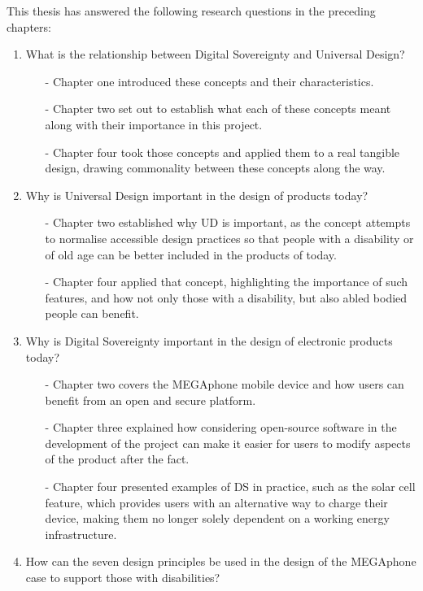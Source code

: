 This thesis has answered the following research questions in the preceding chapters:
\begin{enumerate}
    \item What is the relationship between Digital Sovereignty and Universal Design?
        \begin{enumerate}
        \item[-] Chapter one introduced these concepts and their characteristics.
        \item[-] Chapter two set out to establish what each of these concepts meant along with their importance in this project.
        \item[-] Chapter four took those concepts and applied them to a real tangible design, drawing commonality between these concepts along the way.
        \end{enumerate} 
    \item Why is Universal Design important in the design of products today?
        \begin{enumerate}
        \item[-] Chapter two established why UD is important, as the concept attempts to normalise accessible design practices so that people with a disability or of old age can be better included in the products of today.
        \item[-] Chapter four applied that concept, highlighting the importance of such features, and how not only those with a disability, but also abled bodied people can benefit. 
        \end{enumerate}
    \item Why is Digital Sovereignty important in the design of electronic products today?
        \begin{enumerate}
        \item[-] Chapter two covers the MEGAphone mobile device and how users can benefit from an open and secure platform.
        \item[-] Chapter three explained how considering open-source software in the development of the project can make it easier for users to modify aspects of the product after the fact.
        \item[-] Chapter four presented examples of DS in practice, such as the solar cell feature, which provides users with an alternative way to charge their device, making them no longer solely dependent on a working energy infrastructure.
        \end{enumerate} 
    \item How can the seven design principles be used in the design of the MEGAphone case to support those with disabilities?

\end{enumerate}
